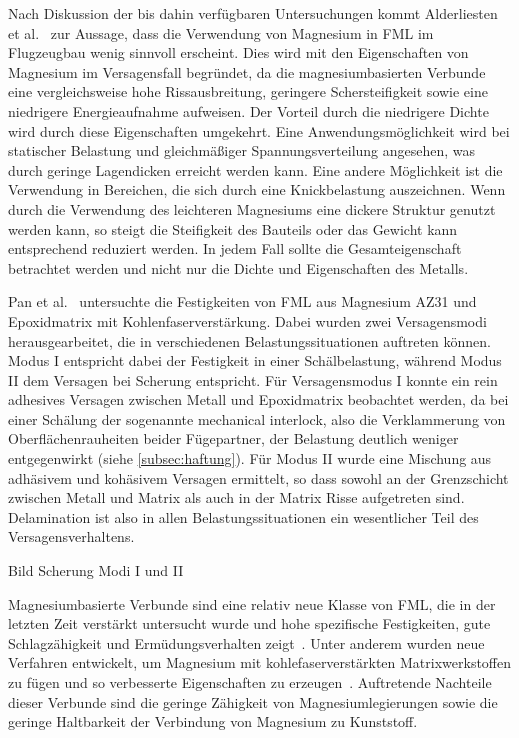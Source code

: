 Nach Diskussion der bis dahin verfügbaren Untersuchungen kommt Alderliesten et al.~\cite{Alderliesten2008} zur Aussage, dass die Verwendung von Magnesium in FML im Flugzeugbau wenig sinnvoll erscheint.
Dies wird mit den Eigenschaften von Magnesium im Versagensfall begründet, da die magnesiumbasierten Verbunde eine vergleichsweise hohe Rissausbreitung, geringere Schersteifigkeit sowie eine niedrigere Energieaufnahme aufweisen.
Der Vorteil durch die niedrigere Dichte wird durch diese Eigenschaften umgekehrt.
Eine Anwendungsmöglichkeit wird bei statischer Belastung und gleichmäßiger Spannungsverteilung angesehen, was durch geringe Lagendicken erreicht werden kann.
Eine andere Möglichkeit ist die Verwendung in Bereichen, die sich durch eine Knickbelastung auszeichnen.
Wenn durch die Verwendung des leichteren Magnesiums eine dickere Struktur genutzt werden kann, so steigt die Steifigkeit des Bauteils oder das Gewicht kann entsprechend reduziert werden.
In jedem Fall sollte die Gesamteigenschaft betrachtet werden und nicht nur die Dichte und Eigenschaften des Metalls.\cite{Alderliesten2008}

Pan et al.~\cite{Pan.2016} untersuchte die Festigkeiten von FML aus Magnesium AZ31 und Epoxidmatrix mit Kohlenfaserverstärkung.
Dabei wurden zwei Versagensmodi herausgearbeitet, die in verschiedenen Belastungssituationen auftreten können.
Modus I entspricht dabei der Festigkeit in einer Schälbelastung, während Modus II dem Versagen bei Scherung entspricht.
Für Versagensmodus I konnte ein rein adhesives Versagen zwischen Metall und Epoxidmatrix beobachtet werden, da bei einer Schälung der sogenannte mechanical interlock, also die Verklammerung von Oberflächenrauheiten beider Fügepartner, der Belastung deutlich weniger entgegenwirkt (siehe \autoref{subsec:haftung}).
Für Modus II wurde eine Mischung aus adhäsivem und kohäsivem Versagen ermittelt, so dass sowohl an der Grenzschicht zwischen Metall und Matrix als auch in der Matrix Risse aufgetreten sind.
Delamination ist also in allen Belastungssituationen ein wesentlicher Teil des Versagensverhaltens.

Bild Scherung Modi I und II

Magnesiumbasierte Verbunde sind eine relativ neue Klasse von FML, die in der letzten Zeit verstärkt untersucht wurde und hohe spezifische Festigkeiten, gute Schlagzähigkeit und Ermüdungsverhalten zeigt~\cite{Cicco.2019}.
Unter anderem wurden neue Verfahren entwickelt, um Magnesium mit kohlefaserverstärkten Matrixwerkstoffen zu fügen und so verbesserte Eigenschaften zu erzeugen~\cite{Pan2017c}.
Auftretende Nachteile dieser Verbunde sind die geringe Zähigkeit von Magnesiumlegierungen sowie die geringe Haltbarkeit der Verbindung von Magnesium zu Kunststoff.

